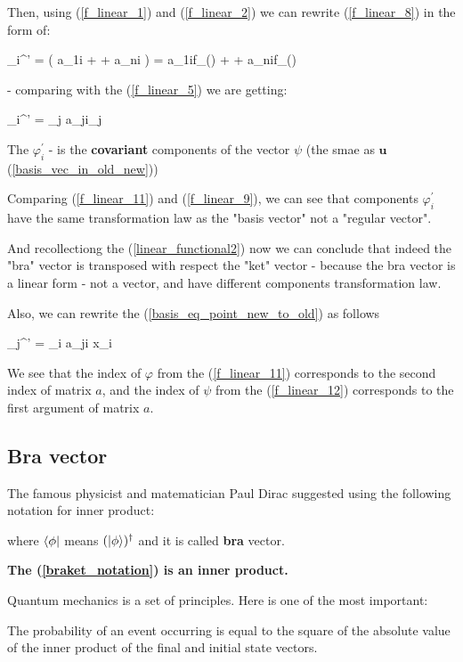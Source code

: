 \documentclass{article}
\begin{document}
Then, using (\ref{f_linear_1}) and (\ref{f_linear_2}) we can rewrite (\ref{f_linear_8}) in the form of:

\beq \label{f_linear_10}
\varphi_{i}^{'} = \varphi( a_{1i} + \cdots + a_{ni} ) = 
a_{1i}f_{\phi}() + \cdots + a_{ni}f_{\phi}()
\eeq

- comparing with the (\ref{f_linear_5}) we are getting:


\beq \label{f_linear_11}
\varphi_{i}^{'} = \sum_{j} a_{ji}\varphi_{j}
\eeq

The $\varphi_{i}^{'}$ - is the \textbf{covariant} components of the vector $\psi$ (the smae as $\bm{u}$ (\ref{basis_vec_in_old_new}))

Comparing (\ref{f_linear_11}) and  (\ref{f_linear_9}), we can see that components $\varphi_{i}^{'}$ have the same transformation law as the "basis vector" not a "regular vector".

And recollectiong the (\ref{linear_functional2}) now we can conclude that indeed the "bra" vector is transposed with respect the "ket" vector - because the bra vector is a linear form - not a vector, and have different components transformation law.

Also, we can rewrite the (\ref{basis_eq_point_new_to_old}) as follows

\beq \label{f_linear_12}
\psi_{j}^{'} = \sum_{i} a_{ji} x_{i}
\eeq

We see that the index of $\varphi$ from the (\ref{f_linear_11}) corresponds to the second index of matrix $a$,
and the index of $\psi$ from the (\ref{f_linear_12}) corresponds to the first argument of matrix $a$.


\subsection{Bra vector}


The famous physicist and matematician Paul Dirac suggested using the following notation for inner product:

\beq \label{braket_notation}
\bra{\phi}\ket{\psi}
\eeq

where $\bra{\phi}$ means $(\ket{\phi})^{\dag}$ and it is called \textbf{bra} vector.

\textbf{The (\ref{braket_notation}) is an inner product.}


Quantum mechanics is a set of principles. Here is one of the most important:

\noindent
The probability of an event occurring is equal to the square of the absolute value of the inner product of the final and initial state vectors.
\end{document}
